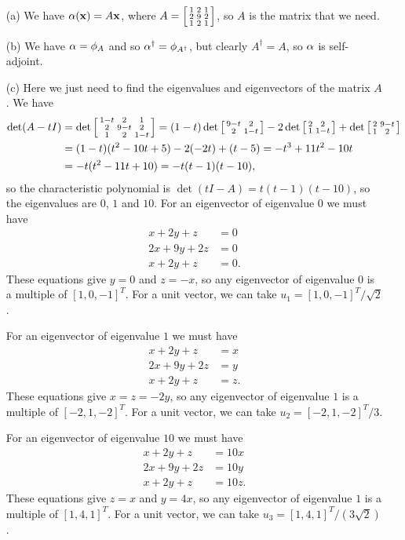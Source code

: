  \begin{itemize}
  \item[(a)] We have $\alpha(\mathbf{x})=A\mathbf{x}$, where
   $\displaystyle A=\left[\begin{smallmatrix} 1&2&1\\ 2&9&2\\ 1&2&1\end{smallmatrix}\right]$, so $A$ is the
   matrix that we need.
  \item[(b)] We have $\alpha=\phi_A$ and so $\alpha^\dag=\phi_{A^\dag}$, but
   clearly $A^\dag=A$, so $\alpha$ is self-adjoint.
  \item[(c)] Here we just need to find the eigenvalues and
   eigenvectors of the matrix $A$.  We have
   \begin{align*}
    \det(A-tI) &=
       \det\left[\begin{smallmatrix} 1-t & 2 & 1 \\ 2 & 9-t & 2 \\ 1 & 2 & 1-t \end{smallmatrix}\right]
     = (1-t)\det\left[\begin{smallmatrix} 9-t & 2 \\ 2 & 1-t \end{smallmatrix}\right]
         -2 \det\left[\begin{smallmatrix} 2 & 2 \\ 1 & 1-t \end{smallmatrix}\right]
          + \det\left[\begin{smallmatrix} 2 & 9-t \\ 1 & 2 \end{smallmatrix}\right] \\
    &= (1-t)(t^2-10t+5)  - 2(-2t) + (t-5)
     = -t^3 + 11t^2 - 10t  \\
    &= -t(t^2-11t+10) = -t(t-1)(t-10),
   \end{align*}
   so the characteristic polynomial is $\det(tI-A)=t(t-1)(t-10)$, so
   the eigenvalues are $0$, $1$ and $10$.  For an eigenvector of
   eigenvalue $0$ we must have
   \begin{align*}
    x+2y+z &= 0 \\
    2x+9y+2z &= 0 \\
    x+2y+z &= 0.
   \end{align*}
   These equations give $y=0$ and $z=-x$, so any eigenvector of
   eigenvalue $0$ is a multiple of $[1,0,-1]^T$.  For a unit vector,
   we can take $u_1=[1,0,-1]^T/\sqrt{2}$.

   For an eigenvector of eigenvalue $1$ we must have
   \begin{align*}
    x+2y+z &= x \\
    2x+9y+2z &= y \\
    x+2y+z &= z.
   \end{align*}
   These equations give $x=z=-2y$, so any eigenvector of eigenvalue
   $1$ is a multiple of $[-2,1,-2]^T$.  For a unit vector, we can take
   $u_2=[-2,1,-2]^T/3$.

   For an eigenvector of eigenvalue $10$ we must have
   \begin{align*}
    x+2y+z &= 10x \\
    2x+9y+2z &= 10y \\
    x+2y+z &= 10z.
   \end{align*}
   These equations give $z=x$ and $y=4x$, so any eigenvector of eigenvalue
   $1$ is a multiple of $[1,4,1]^T$.  For a unit vector, we can take
   $u_3=[1,4,1]^T/(3\sqrt{2})$.


\end{itemize}
